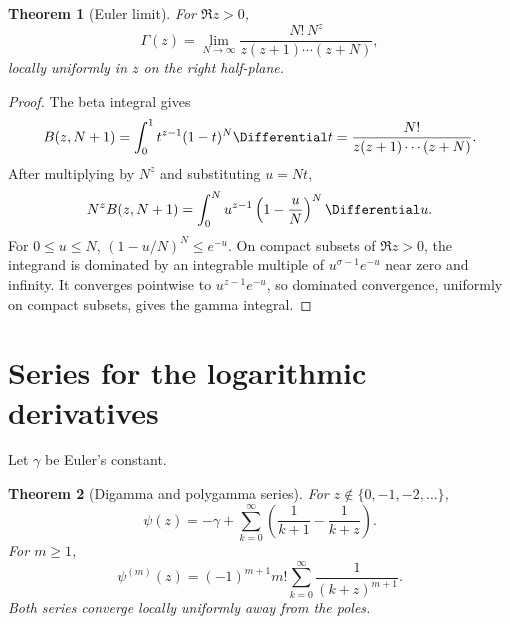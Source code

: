 \documentclass[11pt,a4paper,oneside,openany]{book}
\newtheorem{theorem}{Theorem}[chapter]
\theoremstyle{definition}
\theoremstyle{remark}
\begin{document}
\begin{theorem}[Euler limit]\label{thm:new-euler-gamma-limit}
For $\Re z>0$,
\begin{equation}\label{eq:new-euler-gamma-limit}
 \Gamma(z)=\lim_{N\to\infty}
 \frac{N!\,N^z}{z(z+1)\cdots(z+N)},
\end{equation}
locally uniformly in $z$ on the right half-plane.
\end{theorem}

\begin{proof}
The beta integral gives
\[
 B(z,N+1)=\int_0^1t^{z-1}(1-t)^N\Differential t
 =\frac{N!}{z(z+1)\cdots(z+N)}.
\]
After multiplying by $N^z$ and substituting $u=Nt$,
\[
 N^zB(z,N+1)=\int_0^N u^{z-1}\left(1-\frac uN\right)^N\Differential u.
\]
For $0\le u\le N$, $(1-u/N)^N\le e^{-u}$.  On compact subsets of
$\Re z>0$, the integrand is dominated by an integrable multiple of
$u^{\sigma-1}e^{-u}$ near zero and infinity.  It converges pointwise to
$u^{z-1}e^{-u}$, so dominated convergence, uniformly on compact subsets,
gives the gamma integral.
\end{proof}

\section{Series for the logarithmic derivatives}

Let $\gamma$ be Euler's constant.

\begin{theorem}[Digamma and polygamma series]\label{thm:new-polygamma-series}
For $z\notin\{0,-1,-2,\ldots\}$,
\begin{equation}\label{eq:new-digamma-series}
 \boxed{\displaystyle
 \psi(z)=-\gamma+\sum_{k=0}^{\infty}
 \left(\frac1{k+1}-\frac1{k+z}\right).}
\end{equation}
For $m\ge1$,
\begin{equation}\label{eq:new-polygamma-series}
 \boxed{\displaystyle
 \psi^{(m)}(z)=(-1)^{m+1}m!
 \sum_{k=0}^{\infty}\frac1{(k+z)^{m+1}}.}
\end{equation}
Both series converge locally uniformly away from the poles.
\end{theorem}
\end{document}
